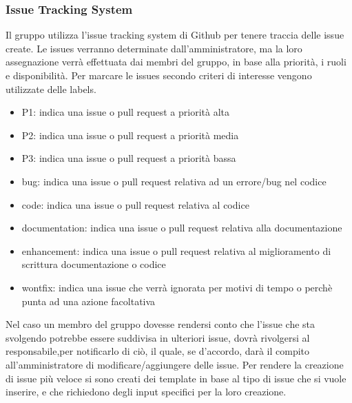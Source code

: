         \subsubsection{Issue Tracking System}
        Il gruppo utilizza l'issue tracking system di Github per tenere traccia delle issue create. Le issues verranno
        determinate dall'amministratore, ma la loro assegnazione verrà effettuata dai membri del gruppo, in base
        alla priorità, i ruoli e disponibilità.
        Per marcare le issues secondo criteri di interesse vengono utilizzate delle labels.
        \begin{itemize}
            \item P1: indica una issue o pull request a priorità alta
            \item P2: indica una issue o pull request a priorità media
            \item P3: indica una issue o pull request a priorità bassa
            \item bug: indica una issue o pull request relativa ad un errore/bug nel codice
            \item code: indica una issue o pull request relativa al codice
            \item documentation: indica una issue o pull request relativa alla documentazione
            \item enhancement: indica una issue o pull request relativa al miglioramento di scrittura documentazione o codice
            \item wontfix: indica una issue che verrà ignorata per motivi di tempo o perchè punta ad una azione facoltativa
        \end{itemize}
        Nel caso un membro del gruppo dovesse rendersi conto che l'issue che sta svolgendo potrebbe essere
        suddivisa in ulteriori issue, dovrà rivolgersi al responsabile,per notificarlo di ciò, il quale, se d'accordo,
        darà il compito all'amministratore di modificare/aggiungere delle issue.
        Per rendere la creazione di issue più veloce si sono creati dei template in base al tipo di issue che si vuole inserire, e che richiedono degli input
        specifici per la loro creazione.
